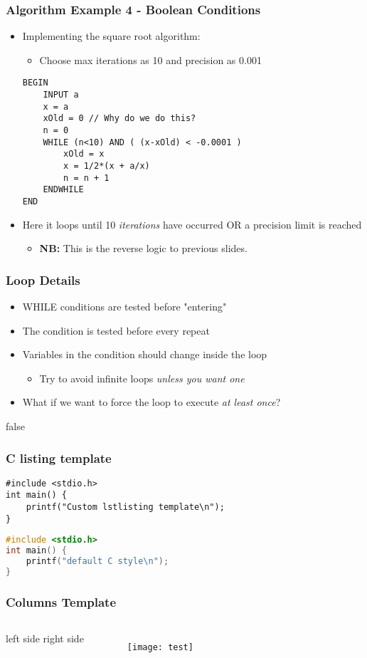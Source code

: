\documentclass[14pt]{beamer}
\begin{document}
\begin{frame}[fragile]
\frametitle{Algorithm Example 4 - Boolean Conditions}
\begin{itemize}
\item Implementing the square root algorithm:
	\begin{itemize}
		\item Choose max iterations as 10 and precision as 0.001
	\end{itemize}

\begin{lstlisting}[style=pseudo,mathescape=true,basicstyle=\ttfamily\scriptsize]
BEGIN
	INPUT a
	x = a
	xOld = 0 // Why do we do this?
	n = 0
	WHILE (n<10) AND ( (x-xOld) < -0.0001 )
		xOld = x
		x = 1/2*(x + a/x)
		n = n + 1
	ENDWHILE 
END
\end{lstlisting}

\item Here it loops until 10 \textit{iterations} have occurred OR a precision limit is reached
	\begin{itemize}
		\item \textbf{NB:} This is the reverse logic to previous slides.
	\end{itemize}
\end{itemize}
\end{frame}

\begin{frame}
\frametitle{Loop Details}
\begin{itemize}
\item WHILE conditions are tested before "entering"
\item The condition is tested before every repeat
\item Variables in the condition should change inside the loop
	\begin{itemize}
		\item Try to avoid infinite loops \textit{unless you want one}
	\end{itemize}
\item What if we want to force the loop to execute \textit{at least once}?
\end{itemize}
\end{frame}

\if false
\begin{frame}[fragile] %
\frametitle{C listing template}
\begin{lstlisting}[style=CStyle]
#include <stdio.h>
int main() {
	printf("Custom lstlisting template\n");
}
\end{lstlisting}

\begin{lstlisting}[language=c]
#include <stdio.h>
int main() {
	printf("default C style\n");
}
\end{lstlisting}
\end{frame}

\begin{frame}
\frametitle{Columns Template}
\begin{columns}
\column{1.5in}
left side
\column{1.5in}
right side
\begin{figure}
\texttt{[image: test]}
\end{figure}
\end{columns}
\end{frame}
\fi
\end{document}

